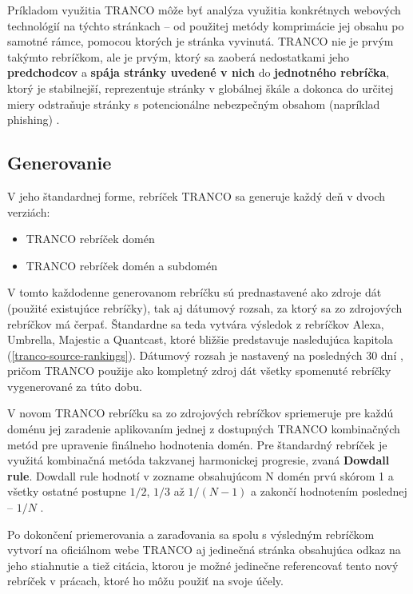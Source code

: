 Príkladom využitia TRANCO môže byť analýza využitia konkrétnych webových technológií na týchto stránkach -- od použitej metódy komprimácie jej obsahu po samotné rámce, pomocou ktorých je 
stránka vyvinutá. 
TRANCO nie je prvým takýmto rebríčkom, ale je prvým, ktorý sa zaoberá nedostatkami jeho \textbf{predchodcov} a \textbf{spája stránky uvedené v nich} do \textbf{jednotného rebríčka}, 
ktorý je stabilnejší, reprezentuje stránky v globálnej škále a dokonca do určitej miery odstraňuje stránky s potencionálne nebezpečným obsahom (napríklad phishing) \cite{tranco}. 

\subsection{Generovanie}
\label{tranco-generation}

V jeho štandardnej forme, rebríček TRANCO sa generuje každý deň v dvoch verziách:
\begin{itemize}
    \item TRANCO rebríček domén
    \item TRANCO rebríček domén a subdomén
\end{itemize}

V tomto každodenne generovanom rebríčku sú prednastavené ako zdroje dát (použité existujúce rebríčky), tak aj dátumový rozsah, za ktorý sa zo zdrojových rebríčkov má čerpať.
Štandardne sa teda vytvára výsledok z rebríčkov Alexa, Umbrella, Majestic a Quantcast, ktoré bližšie predstavuje nasledujúca kapitola (\ref{tranco-source-rankings}). 
Dátumový rozsah je nastavený na posledných 30 dní \cite{tranco-github}, pričom TRANCO použije ako kompletný zdroj dát všetky spomenuté rebríčky vygenerované za túto dobu. 

V novom TRANCO rebríčku sa zo zdrojových rebríčkov spriemeruje pre každú doménu jej zaradenie aplikovaním jednej z dostupných TRANCO kombinačných metód pre upravenie finálneho hodnotenia domén.
Pre štandardný rebríček je využitá kombinačná metóda takzvanej harmonickej progresie, zvaná \textbf{Dowdall rule}. Dowdall rule hodnotí v zozname obsahujúcom N domén prvú skórom 1 a všetky ostatné postupne \(1/2\), \(1/3\) až \(1/(N-1)\) a zakončí hodnotením poslednej -- \(1/N\) \cite{tranco}\cite{tranco-homepage}.

Po dokončení priemerovania a zaraďovania sa spolu s výsledným rebríčkom vytvorí na oficiálnom webe TRANCO aj jedinečná stránka obsahujúca odkaz na jeho stiahnutie a tiež citácia, 
ktorou je možné jedinečne referencovať tento nový rebríček v prácach, ktoré ho môžu použiť na svoje účely.

